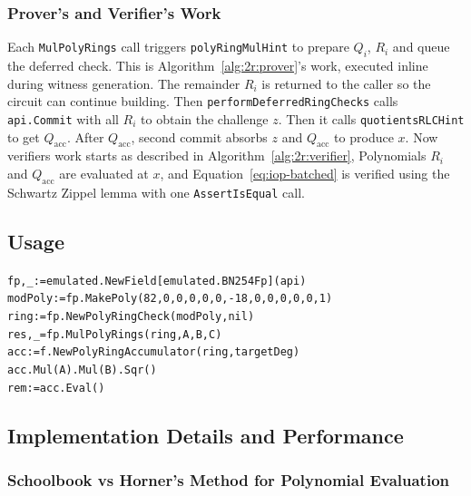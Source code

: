 \subsubsection{Prover's and Verifier's Work}
Each \texttt{MulPolyRings} call triggers \texttt{polyRingMulHint} to prepare $Q_i$, $R_i$ and queue the deferred check. This is Algorithm~\ref{alg:2r:prover}'s work, executed inline during witness generation. The remainder $R_i$ is returned to the caller so the circuit can continue building. Then \texttt{performDeferredRingChecks} calls \texttt{api.Commit} with all $R_i$ to obtain the challenge $z$. Then it calls \texttt{quotientsRLCHint} to get $Q_\text{acc}$. After $Q_\text{acc}$, second commit absorbs $z$ and $Q_\text{acc}$ to produce $x$.
Now verifiers work starts as described in Algorithm~\ref{alg:2r:verifier}, Polynomials $R_i$ and $Q_\text{acc}$ are evaluated at $x$, and Equation~\eqref{eq:iop-batched} is verified using the Schwartz Zippel lemma with one \texttt{AssertIsEqual} call.


\subsection{Usage}
\label{sec:prt:usage}

\begin{alltt}
fp, _ := emulated.NewField[emulated.BN254Fp](api)
modPoly := fp.MakePoly(82, 0, 0, 0, 0, 0, -18, 0, 0, 0, 0, 0, 1)
ring := fp.NewPolyRingCheck(modPoly, nil)
res, _ = fp.MulPolyRings(ring, A, B, C) 
acc := f.NewPolyRingAccumulator(ring, targetDeg)
acc.Mul(A).Mul(B).Sqr()  
rem := acc.Eval()        
\end{alltt}

\subsection{Implementation Details and Performance}
\label{sec:prt:performance}

\subsubsection{Schoolbook vs Horner's Method for Polynomial Evaluation}
\label{sec:emulated:flat}


